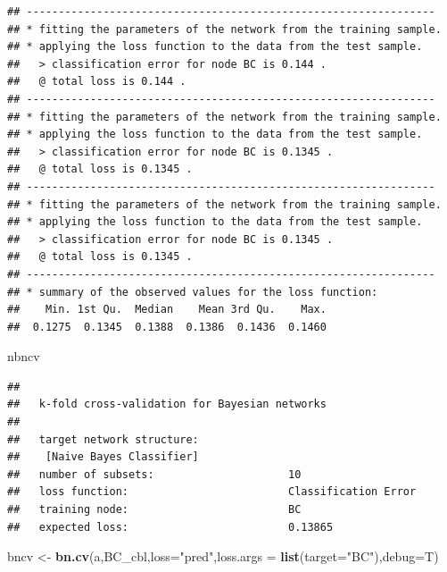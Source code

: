 \documentclass[]{article}
\newenvironment{Shaded}{\begin{snugshade}}{\end{snugshade}}
\newcommand{\KeywordTok}[1]{\textcolor[rgb]{0.13,0.29,0.53}{\textbf{{#1}}}}
\newcommand{\DataTypeTok}[1]{\textcolor[rgb]{0.13,0.29,0.53}{{#1}}}
\newcommand{\StringTok}[1]{\textcolor[rgb]{0.31,0.60,0.02}{{#1}}}
\newcommand{\NormalTok}[1]{{#1}}
\begin{document}
\begin{verbatim}
## ----------------------------------------------------------------
## * fitting the parameters of the network from the training sample.
## * applying the loss function to the data from the test sample.
##   > classification error for node BC is 0.144 .
##   @ total loss is 0.144 .
## ----------------------------------------------------------------
## * fitting the parameters of the network from the training sample.
## * applying the loss function to the data from the test sample.
##   > classification error for node BC is 0.1345 .
##   @ total loss is 0.1345 .
## ----------------------------------------------------------------
## * fitting the parameters of the network from the training sample.
## * applying the loss function to the data from the test sample.
##   > classification error for node BC is 0.1345 .
##   @ total loss is 0.1345 .
## ----------------------------------------------------------------
## * summary of the observed values for the loss function:
##    Min. 1st Qu.  Median    Mean 3rd Qu.    Max. 
##  0.1275  0.1345  0.1388  0.1386  0.1436  0.1460
\end{verbatim}

\begin{Shaded}
\begin{Highlighting}[]
\NormalTok{nbncv}
\end{Highlighting}
\end{Shaded}

\begin{verbatim}
## 
##   k-fold cross-validation for Bayesian networks
## 
##   target network structure:
##    [Naive Bayes Classifier]
##   number of subsets:                     10 
##   loss function:                         Classification Error 
##   training node:                         BC 
##   expected loss:                         0.13865
\end{verbatim}

\begin{Shaded}
\begin{Highlighting}[]
\NormalTok{bncv <-}\StringTok{ }\KeywordTok{bn.cv}\NormalTok{(a,BC_cbl,}\DataTypeTok{loss=}\StringTok{"pred"}\NormalTok{,}\DataTypeTok{loss.args =} \KeywordTok{list}\NormalTok{(}\DataTypeTok{target=}\StringTok{"BC"}\NormalTok{),}\DataTypeTok{debug=}\NormalTok{T)}
\end{Highlighting}
\end{Shaded}
\end{document}
